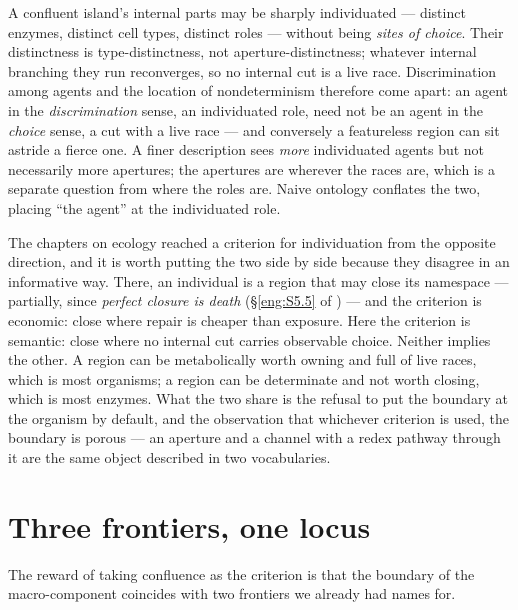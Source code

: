 \begin{remark}\label{ndo:rmk:two}
A confluent island's internal parts may be sharply individuated --- distinct enzymes,
distinct cell types, distinct roles --- without being \emph{sites of choice}. Their
distinctness is type-distinctness, not aperture-distinctness; whatever internal
branching they run reconverges, so no internal cut is a live race. Discrimination among
agents and the location of nondeterminism therefore come apart: an agent in the
\emph{discrimination} sense, an individuated role, need not be an agent in the
\emph{choice} sense, a cut with a live race --- and conversely a featureless region can
sit astride a fierce one. A finer description sees \emph{more} individuated agents but
not necessarily more apertures; the apertures are wherever the races are, which is a
separate question from where the roles are. Naive ontology conflates the two, placing
``the agent'' at the individuated role.
\end{remark}

\begin{remark}\label{ndo:rmk:ecology}
The chapters on ecology reached a criterion for individuation from the opposite
direction, and it is worth putting the two side by side because they disagree in an
informative way. There, an individual is a region that may close its namespace ---
partially, since \emph{perfect closure is death}
(\S\ref{eng:S5.5} of \chEng) --- and the criterion is economic: close where repair is
cheaper than exposure. Here the criterion is semantic: close where no internal cut
carries observable choice. Neither implies the other. A region can be metabolically
worth owning and full of live races, which is most organisms; a region can be
determinate and not worth closing, which is most enzymes. What the two share is the
refusal to put the boundary at the organism by default, and the observation that
whichever criterion is used, the boundary is porous --- an aperture and a channel with a
redex pathway through it are the same object described in two vocabularies.
\end{remark}

\section{Three frontiers, one locus}\label{ndo:sec:frontier}

The reward of taking confluence as the criterion is that the boundary of the
macro-component coincides with two frontiers we already had names for.


